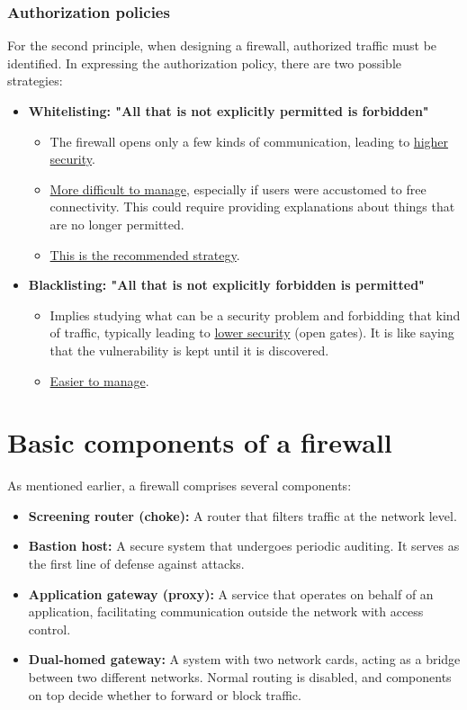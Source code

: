 \subsubsection{Authorization policies}
For the second principle, when designing a firewall, authorized traffic must be identified. In expressing the authorization policy, there are two possible strategies:
\begin{itemize}
    \item \textbf{Whitelisting: "All that is not explicitly permitted is forbidden"}
          \begin{itemize}
              \item The firewall opens only a few kinds of communication, leading to \underline{higher security}.
              \item \underline{More difficult to manage}, especially if users were accustomed to free connectivity. This could require providing explanations about things that are no longer permitted.
              \item \underline{This is the recommended strategy}.
          \end{itemize}
    \item \textbf{Blacklisting: "All that is not explicitly forbidden is permitted"}
          \begin{itemize}
              \item Implies studying what can be a security problem and forbidding that kind of traffic, typically leading to \underline{lower security} (open gates). It is like saying that the vulnerability is kept until it is discovered.
              \item \underline{Easier to manage}.
          \end{itemize}
\end{itemize}



\section{Basic components of a firewall}
As mentioned earlier, a firewall comprises several components:
\begin{itemize}
    \item \textbf{Screening router (choke):} A router that filters traffic at the network level.
    \item \textbf{Bastion host:} A secure system that undergoes periodic auditing. It serves as the first line of defense against attacks.
    \item \textbf{Application gateway (proxy):} A service that operates on behalf of an application, facilitating communication outside the network with access control.
    \item \textbf{Dual-homed gateway:} A system with two network cards, acting as a bridge between two different networks. Normal routing is disabled, and components on top decide whether to forward or block traffic.
\end{itemize}

